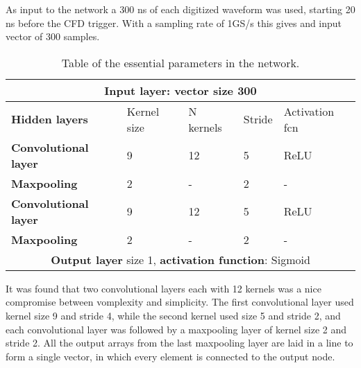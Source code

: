 \documentclass[main.tex]{subfiles}
\begin{document}
As input to the network a 300 ns of each digitized waveform was used, starting 20 ns before the CFD trigger. With a sampling rate of 1GS/s this gives and input vector of 300 samples.
\begin{table}[hb]
\center
\begin{tabular}{|l|l|l|l|l|}
\hline
\multicolumn{5}{|c|}{\textbf{Input layer}: vector size 300}                                            \\ \hline
\textbf{Hidden layers}       & Kernel size & N kernels & Stride & Activation fcn \\ \hline
\textbf{Convolutional layer} & 9           & 12                & 5             & ReLU                \\ \hline
\textbf{Maxpooling}          & 2           & -                 & 2             & -                   \\ \hline
\textbf{Convolutional layer} & 9           & 12                & 5             & ReLU                \\ \hline
\textbf{Maxpooling}          & 2           & -                 & 2             & -                   \\ \hline
\multicolumn{5}{|c|}{\textbf{Output layer} size 1, \textbf{activation function}: Sigmoid}               \\ \hline
\end{tabular}
\caption{Table of the essential parameters in the network.}
\label{tab:architecture}
\end{table}

It was found that two convolutional layers each with 12 kernels was a nice compromise between vomplexity and simplicity. The first convolutional layer used kernel size 9 and stride 4, while the second kernel used size 5 and stride 2, and each convolutional layer was followed by a maxpooling layer of kernel size 2 and stride 2. All the output arrays from the last maxpooling layer are laid in a line to form a single vector, in which every element is connected to the output node.
\end{document}
